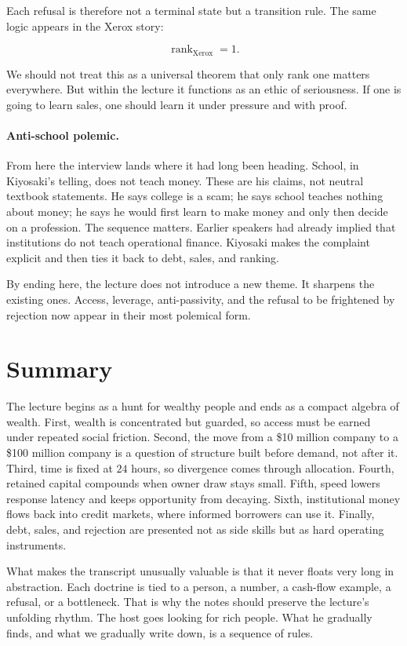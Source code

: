 Each refusal is therefore not a terminal state but a transition rule. The same logic appears in the Xerox story:

\begin{equation}
\operatorname{rank}_{\text{Xerox}} = 1.
\end{equation}

We should not treat this as a universal theorem that only rank one matters everywhere. But within the lecture it functions as an ethic of seriousness. If one is going to learn sales, one should learn it under pressure and with proof.

\paragraph{Anti-school polemic.} From here the interview lands where it had long been heading. School, in Kiyosaki's telling, does not teach money. These are his claims, not neutral textbook statements. He says college is a scam; he says school teaches nothing about money; he says he would first learn to make money and only then decide on a profession. The sequence matters. Earlier speakers had already implied that institutions do not teach operational finance. Kiyosaki makes the complaint explicit and then ties it back to debt, sales, and ranking.

By ending here, the lecture does not introduce a new theme. It sharpens the existing ones. Access, leverage, anti-passivity, and the refusal to be frightened by rejection now appear in their most polemical form.

\section{Summary}

The lecture begins as a hunt for wealthy people and ends as a compact algebra of wealth. First, wealth is concentrated but guarded, so access must be earned under repeated social friction. Second, the move from a \$10 million company to a \$100 million company is a question of structure built before demand, not after it. Third, time is fixed at \(24\) hours, so divergence comes through allocation. Fourth, retained capital compounds when owner draw stays small. Fifth, speed lowers response latency and keeps opportunity from decaying. Sixth, institutional money flows back into credit markets, where informed borrowers can use it. Finally, debt, sales, and rejection are presented not as side skills but as hard operating instruments.

What makes the transcript unusually valuable is that it never floats very long in abstraction. Each doctrine is tied to a person, a number, a cash-flow example, a refusal, or a bottleneck. That is why the notes should preserve the lecture's unfolding rhythm. The host goes looking for rich people. What he gradually finds, and what we gradually write down, is a sequence of rules.